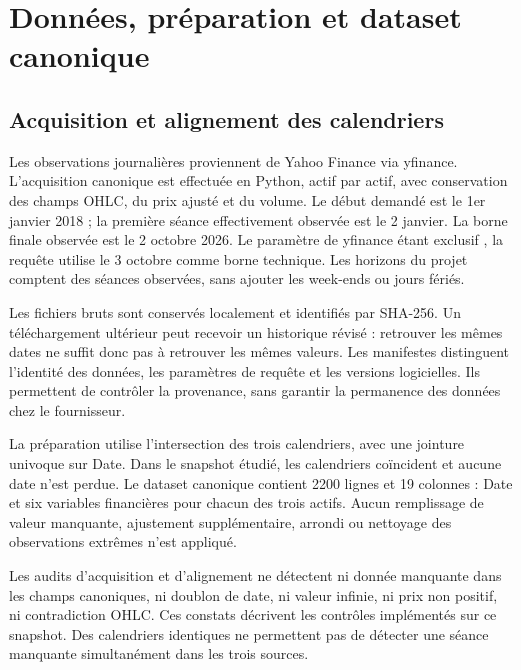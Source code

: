\section{Données, préparation et dataset canonique}
\label{sec:data}

\subsection{Acquisition et alignement des calendriers}



Les observations journalières proviennent de Yahoo Finance via yfinance. L’acquisition canonique est effectuée en Python, actif par actif, avec conservation des champs OHLC, du prix ajusté et du volume. Le début demandé est le 1er janvier 2018 ; la première séance effectivement observée est le 2 janvier. La borne finale observée est le 2 octobre 2026. Le paramètre  de yfinance étant exclusif \cite{R3}, la requête utilise le 3 octobre comme borne technique. Les horizons du projet comptent des séances observées, sans ajouter les week-ends ou jours fériés.



Les fichiers bruts sont conservés localement et identifiés par SHA-256. Un téléchargement ultérieur peut recevoir un historique révisé : retrouver les mêmes dates ne suffit donc pas à retrouver les mêmes valeurs. Les manifestes distinguent l’identité des données, les paramètres de requête et les versions logicielles. Ils permettent de contrôler la provenance, sans garantir la permanence des données chez le fournisseur.



La préparation utilise l’intersection des trois calendriers, avec une jointure univoque sur Date. Dans le snapshot étudié, les calendriers coïncident et aucune date n’est perdue. Le dataset canonique contient 2200 lignes et 19 colonnes : Date et six variables financières pour chacun des trois actifs. Aucun remplissage de valeur manquante, ajustement supplémentaire, arrondi ou nettoyage des observations extrêmes n’est appliqué.







Les audits d’acquisition et d’alignement ne détectent ni donnée manquante dans les champs canoniques, ni doublon de date, ni valeur infinie, ni prix non positif, ni contradiction OHLC. Ces constats décrivent les contrôles implémentés sur ce snapshot. Des calendriers identiques ne permettent pas de détecter une séance manquante simultanément dans les trois sources.



